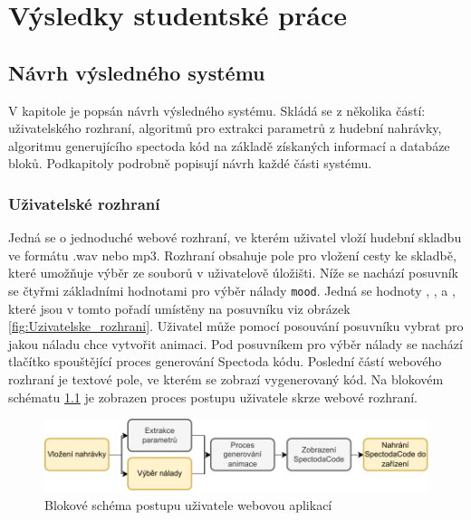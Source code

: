 \chapter{Výsledky studentské práce}



\section{Návrh výsledného systému} \label{sec:Navrh_systemu}

V kapitole je popsán návrh výsledného systému. Skládá se z několika částí: uživatelského rozhraní, algoritmů pro extrakci parametrů z hudební nahrávky, algoritmu generujícího spectoda kód na základě získaných informací a databáze bloků. Podkapitoly podrobně popisují návrh každé části systému.

\subsection{Uživatelské rozhraní} \label{sec:User_interface}

Jedná se o jednoduché webové rozhraní, ve kterém uživatel vloží hudební skladbu ve formátu .wav nebo mp3. Rozhraní obsahuje pole pro vložení cesty ke skladbě, které umožňuje výběr ze souborů v uživatelově úložišti. Níže se nachází posuvník se čtyřmi základními hodnotami pro výběr nálady
\texttt{mood}. Jedná se hodnoty , ,  a , které jsou v tomto pořadí umístěny na posuvníku viz obrázek \ref{fig:Uzivatelske_rozhrani}. Uživatel může pomocí posouvání posuvníku vybrat pro jakou náladu chce vytvořit animaci. Pod posuvníkem pro výběr nálady se nachází tlačítko spouštějící proces generování Spectoda kódu.
Poslední částí webového rozhraní je textové pole, ve kterém se zobrazí vygenerovaný kód. Na blokovém schématu \ref{fig:User_interaction_diagram} je zobrazen proces postupu uživatele skrze webové rozhraní. 

 \begin{figure}[H]
    \centering
    \includegraphics[width = 1\linewidth]{obrazky/User_interaction_diagram.pdf}
    \caption{Blokové schéma postupu uživatele webovou aplikací}
    \label{fig:User_interaction_diagram}
\end{figure}


